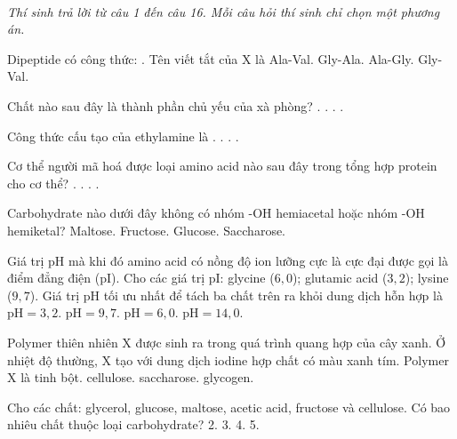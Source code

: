 \documentclass[11pt,a4paper]{article}
\begin{document}
 \\
\textit{Thí sinh trả lời từ câu 1 đến câu 16. Mỗi câu hỏi thí sinh chỉ chọn một phương án.}
\vspace{4pt}
\begin{ex}
Dipeptide có công thức: . Tên viết tắt của X là
\choice
{Ala-Val.}
{Gly-Ala.}
{Ala-Gly.}
{Gly-Val.}
\loigiai{}
\end{ex}
\begin{ex}
Chất nào sau đây là thành phần chủ yếu của xà phòng?
\choice
{.}
{.}
{.}
{.}
\loigiai{}
\end{ex}
\begin{ex}
Công thức cấu tạo của ethylamine là
\choice
{.}
{.}
{.}
{.}
\loigiai{}
\end{ex}
\begin{ex}
Cơ thể người mã hoá được loại amino acid nào sau đây trong tổng hợp protein cho cơ thể?
\choice
{.}
{.}
{.}
{.}
\loigiai{}
\end{ex}
\begin{ex}
Carbohydrate nào dưới đây không có nhóm -OH hemiacetal hoặc nhóm -OH hemiketal?
\choice
{Maltose.}
{Fructose.}
{Glucose.}
{Saccharose.}
\loigiai{}
\end{ex}
\begin{ex}
Giá trị pH mà khi đó amino acid có nồng độ ion lưỡng cực là cực đại được gọi là điểm đẳng điện (pI). Cho các giá trị pI: glycine ($6{,}0$); glutamic acid ($3{,}2$); lysine ($9{,}7$). Giá trị pH tối ưu nhất để tách ba chất trên ra khỏi dung dịch hỗn hợp là
\choice
{$\text{pH} = 3{,}2$.}
{$\text{pH} = 9{,}7$.}
{$\text{pH} = 6{,}0$.}
{$\text{pH} = 14{,}0$.}
\loigiai{}
\end{ex}
\begin{ex}
Polymer thiên nhiên X được sinh ra trong quá trình quang hợp của cây xanh. Ở nhiệt độ thường, X tạo với dung dịch iodine hợp chất có màu xanh tím. Polymer X là
\choice
{tinh bột.}
{cellulose.}
{saccharose.}
{glycogen.}
\loigiai{}
\end{ex}
\begin{ex}
Cho các chất: glycerol, glucose, maltose, acetic acid, fructose và cellulose. Có bao nhiêu chất thuộc loại carbohydrate?
\choice
{2.}
{3.}
{4.}
{5.}
\loigiai{}
\end{ex}
\end{document}
